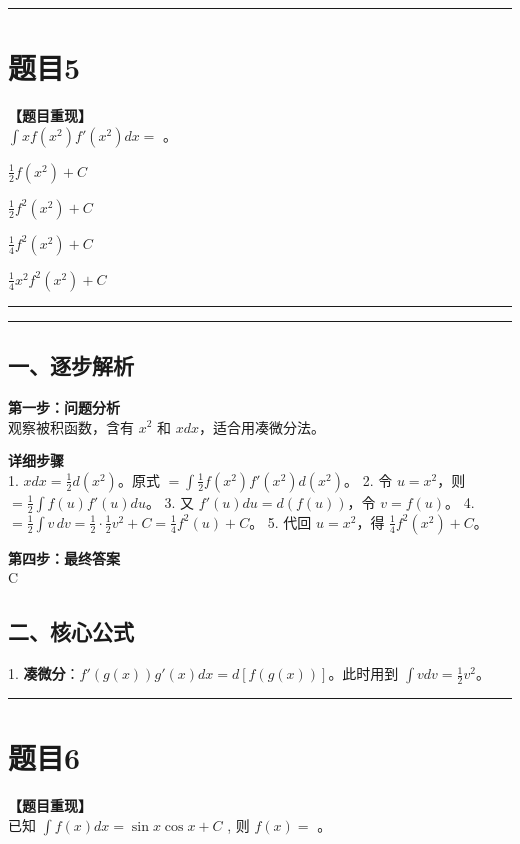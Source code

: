 \documentclass[12pt, a4paper]{ctexart}
\newcommand{\TopSeparator}{
    \par\noindent\rule{\textwidth}{1.5pt}\vspace{0.5em} %
}
\newcommand{\AnalysisSeparator}{
    \par\noindent\rule{\textwidth}{0.5pt}\vspace{0.2em}\hrule\vspace{0.5em} %
}
\newenvironment{RedAnalysis}{
    \par
    \color{red} %
}{
    \par
    \color{black} %
}
\newcommand{\choicesTwo}[4]{
    \begin{enumerate}[label=\Alph*., itemsep=0pt, parsep=0pt, topsep=5pt, labelsep=0.5em]
        \begin{minipage}{0.45\linewidth} \item #1 \end{minipage}
        \begin{minipage}{0.45\linewidth} \item #2 \end{minipage}
        \begin{minipage}{0.45\linewidth} \item #3 \end{minipage}
        \begin{minipage}{0.45\linewidth} \item #4 \end{minipage}
    \end{enumerate}
}
\begin{document}
\vspace{2em}

\TopSeparator
\section*{题目5}

\textbf{【题目重现】} \\
$ \int xf(x^{2})f'(x^{2})dx = $ \underline{\hspace{1cm}}。
\choicesTwo
{$ \frac{1}{2}f(x^{2})+C $}
{$ \frac{1}{2}f^{2}(x^{2})+C $}
{$ \frac{1}{4}f^{2}(x^{2})+C $}
{$ \frac{1}{4}x^{2}f^{2}(x^{2})+C $}

\AnalysisSeparator

\begin{RedAnalysis}

\subsection*{一、逐步解析}

\textbf{第一步：问题分析} \\
观察被积函数，含有 $x^2$ 和 $x dx$，适合用凑微分法。

\textbf{详细步骤} \\
1. $x dx = \frac{1}{2} d(x^2)$。原式 $= \int \frac{1}{2} f(x^2) f'(x^2) d(x^2)$。
2. 令 $u = x^2$，则 $= \frac{1}{2} \int f(u) f'(u) du$。
3. 又 $f'(u) du = d(f(u))$，令 $v = f(u)$。
4. $= \frac{1}{2} \int v \, dv = \frac{1}{2} \cdot \frac{1}{2} v^2 + C = \frac{1}{4} f^2(u) + C$。
5. 代回 $u = x^2$，得 $\frac{1}{4} f^2(x^2) + C$。

\textbf{第四步：最终答案} \\
C

\subsection*{二、核心公式}
1. \textbf{凑微分}：$f'(g(x))g'(x) dx = d[f(g(x))]$。此时用到 $\int v dv = \frac{1}{2} v^2$。

\end{RedAnalysis}

\vspace{2em}

\TopSeparator
\section*{题目6}

\textbf{【题目重现】} \\
已知 $ \int f(x)dx = \sin x \cos x + C $ , 则 $ f(x) = $ \underline{\hspace{2cm}}。
\end{document}
